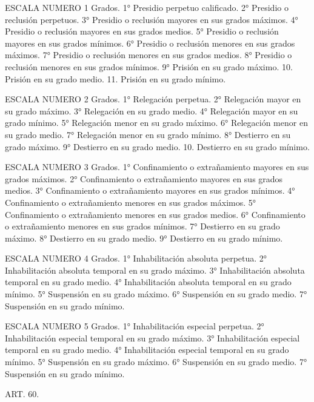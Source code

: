                     ESCALA NUMERO 1
    Grados.
    1° Presidio perpetuo calificado.
    2° Presidio o reclusión perpetuos.
    3° Presidio o reclusión mayores en sus grados máximos.
    4° Presidio o reclusión mayores en sus grados medios.
    5° Presidio o reclusión mayores en sus grados mínimos.
    6° Presidio o reclusión menores en sus grados máximos.
    7° Presidio o reclusión menores en sus grados medios.
    8° Presidio o reclusión menores en sus grados mínimos.
    9° Prisión en su grado máximo.
    10. Prisión en su grado medio.
    11. Prisión en su grado mínimo.

                    ESCALA NUMERO 2
    Grados.
    1° Relegación perpetua.
    2° Relegación mayor en su grado máximo.
    3° Relegación en su grado medio.
    4° Relegación mayor en su grado mínimo.
    5° Relegación menor en su grado máximo.
    6° Relegación menor en su grado medio.
    7° Relegación menor en su grado mínimo.
    8° Destierro en su grado máximo.
    9° Destierro en su grado medio.
    10. Destierro en su grado mínimo.

                  ESCALA NUMERO 3
    Grados.
    1° Confinamiento o extrañamiento mayores en sus grados máximos.
    2° Confinamiento o extrañamiento mayores en sus grados medios.
    3° Confinamiento o extrañamiento mayores en sus grados mínimos.
    4° Confinamiento o extrañamiento menores en sus grados máximos.
    5° Confinamiento o extrañamiento menores en sus grados medios.
    6° Confinamiento o extrañamiento menores en sus grados mínimos.
    7° Destierro en su grado máximo.
    8° Destierro en su grado medio.
    9° Destierro en su grado mínimo.

                  ESCALA NUMERO 4
    Grados.
    1° Inhabilitación absoluta perpetua.
    2° Inhabilitación absoluta temporal en su grado máximo.
    3° Inhabilitación absoluta temporal en su grado medio.
    4° Inhabilitación absoluta temporal en su grado mínimo.
    5° Suspensión en su grado máximo.
    6° Suspensión en su grado medio.
    7° Suspensión en su grado mínimo.

                    ESCALA NUMERO 5
    Grados.
    1° Inhabilitación especial perpetua.
    2° Inhabilitación especial temporal en su grado máximo.
    3° Inhabilitación especial temporal en su grado medio.
    4° Inhabilitación especial temporal en su grado mínimo.
    5° Suspensión en su grado máximo.
    6° Suspensión en su grado medio.
    7° Suspensión en su grado mínimo.


    ART. 60.

